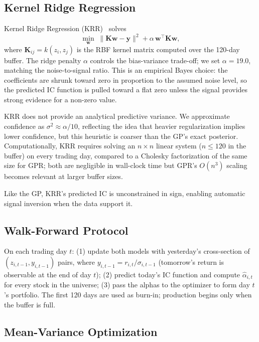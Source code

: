 \documentclass[11pt]{amsart}
\begin{document}
\subsection{Kernel Ridge Regression}

Kernel Ridge Regression (KRR)~\cite{ScholkopfSmola2002} solves
\[
  \min_{\mathbf{w}} \;\|\mathbf{K}\mathbf{w} - \mathbf{y}\|^2
    + \alpha\,\mathbf{w}^\top \mathbf{K} \mathbf{w},
\]
where $\mathbf{K}_{ij} = k(z_i, z_j)$ is the RBF kernel matrix computed
over the 120-day buffer.  The ridge penalty $\alpha$ controls the
bias-variance trade-off; we set $\alpha = 19.0$, matching the
noise-to-signal ratio.  This is an empirical Bayes choice: the coefficients
are shrunk toward zero in proportion to the assumed noise level, so the
predicted IC function is pulled toward a flat zero unless the signal
provides strong evidence for a non-zero value.

KRR does not provide an analytical predictive variance.  We approximate
confidence as $\sigma^2 \approx \alpha / 10$, reflecting the idea that
heavier regularization implies lower confidence, but this heuristic is
coarser than the GP's exact posterior.  Computationally, KRR requires
solving an $n \times n$ linear system ($n \leq 120$ in the buffer)
on every trading day, compared to a Cholesky factorization of the same
size for GPR; both are negligible in wall-clock time but GPR's $O(n^3)$
scaling becomes relevant at larger buffer sizes.

Like the GP, KRR's predicted IC is unconstrained in sign, enabling
automatic signal inversion when the data support it.

\subsection{Walk-Forward Protocol}

On each trading day $t$: (1) update both models with yesterday's
cross-section of $(z_{i,t-1}, y_{i,t-1})$ pairs, where
$y_{i,t-1} = r_{i,t}/\sigma_{i,t-1}$ (tomorrow's return is observable
at the end of day $t$); (2) predict today's IC function and compute
$\hat{\alpha}_{i,t}$ for every stock in the universe; (3) pass the
alphas to the optimizer to form day $t$'s portfolio.  The first 120 days
are used as burn-in; production begins only when the buffer is full.

\subsection{Mean-Variance Optimization}
\label{sec:mvo}
\end{document}
